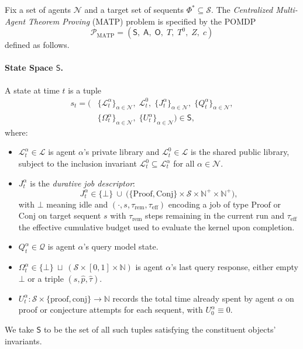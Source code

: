 Fix a set of agents $\mathcal{N}$ and a target set of sequents $\Phi^*\subseteq \mathcal{S}$. The \emph{Centralized Multi-Agent Theorem Proving} (MATP) problem is specified by the POMDP
\[
\mathcal{P}_{\mathrm{MATP}} = (\mathsf{S},\;\mathsf{A},\;\mathsf{O},\;T,\;T^0,\;Z,\;c)
\]
defined as follows.
 
 
\paragraph{State Space $\mathsf{S}$.}
 
A state at time $t$ is a tuple
\begin{align*}
s_t =
\Big(
&\{\mathcal{L}^\alpha_t\}_{\alpha\in\mathcal{N}},\;
\mathcal{L}^0_t,\;
\{J^\alpha_t\}_{\alpha\in\mathcal{N}},\;
\{Q^\alpha_t\}_{\alpha\in\mathcal{N}},
\\&
\{\Omega^\alpha_t\}_{\alpha\in\mathcal{N}},\;
\{U_{t}^\alpha\}_{\alpha\in\mathcal{N}}
\Big)\in\mathsf{S},
\end{align*}
where:
\begin{itemize}
\item $\mathcal{L}^\alpha_t\in\mathscr{L}$ is agent $\alpha$'s private library and
$\mathcal{L}^0_t\in\mathscr{L}$ is the shared public library, subject to the inclusion invariant $\mathcal{L}^0_t \subseteq \mathcal{L}^\alpha_t$ for all $\alpha\in\mathcal{N}$.
\item $J^\alpha_t$ is the \emph{durative job descriptor}:
\[
J^\alpha_t \in \{\bot\}\ \cup\ \big(\{\mathrm{Proof}, \mathrm{Conj}\}\times\mathcal{S}\times\mathbb{N}^+\times\mathbb{N}^+\big),
\]
with $\bot$ meaning idle and $(\cdot,s,\tau_{\mathrm{rem}},\tau_{\mathrm{eff}})$ encoding a job of type $\mathrm{Proof}$ or $\mathrm{Conj}$ on target sequent $s$ with $\tau_{\mathrm{rem}}$ steps remaining in the current run and $\tau_{\mathrm{eff}}$ the effective cumulative budget used to evaluate the kernel upon completion.
\item $Q^\alpha_t\in\mathcal{Q}$ is agent $\alpha$'s query model state.
\item $\Omega^\alpha_t \in \{\bot\}\ \sqcup\ (\mathcal{S}\times[0,1]\times\mathbb{N})$ is agent $\alpha$'s last query response, either empty $\bot$ or a triple $(s,\hat p,\hat \tau)$.
\item $U^\alpha_{t} : \mathcal{S} \times \{\mathrm{proof},\mathrm{conj}\} \to \mathbb{N}$ records the total time already spent by agent $\alpha$ on proof or conjecture attempts for each sequent, with $U^\alpha_0 \equiv 0$.
\end{itemize}
We take $\mathsf{S}$ to be the set of all such tuples satisfying the constituent objects' invariants.
 

